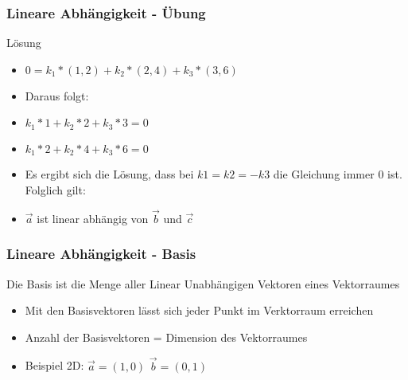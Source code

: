 \begin{frame}
    \frametitle{Lineare Abhängigkeit - Übung}
    Lösung
    \begin{itemize}
        \item $0 = k_1 * (1, 2) + k_2 * (2, 4) + k_3 * (3, 6)$
	\item Daraus folgt:
        \item $k_1 * 1 + k_2 * 2 + k_3 * 3 = 0$
        \item $k_1 * 2 + k_2 * 4 + k_3 * 6 = 0$
	\item Es ergibt sich die Lösung, dass bei $k1 = k2 = -k3$ die Gleichung immer 0 ist. Folglich gilt: 
        \item $\vec{a}$ ist linear abhängig von $\vec{b}$ und $\vec{c}$
    \end{itemize}
\end{frame}

\begin{frame}
    \frametitle{Lineare Abhängigkeit - Basis}
    Die Basis ist die Menge aller Linear Unabhängigen Vektoren eines Vektorraumes
    \begin{itemize}
        \item Mit den Basisvektoren lässt sich jeder Punkt im Verktorraum erreichen
        \item Anzahl der Basisvektoren = Dimension des Vektorraumes
        \item Beispiel 2D: $\vec{a} = (1, 0)$ $\vec{b} = (0, 1)$
        
    \end{itemize}
\end{frame}